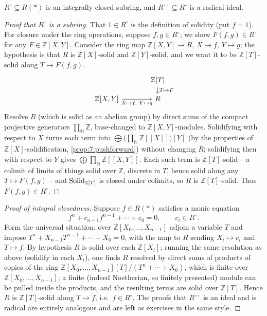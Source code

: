 \begin{lemma}
\label{lem:7:Rzero}
$R^{\circ}\subseteq R(\ast)$ is an integrally closed subring, and
$R^{\circ\circ}\subseteq R^{\circ}$ is a radical ideal.
\end{lemma}

\begin{proof}[Proof that $R^{\circ}$ is a subring]
That $1\in R^{\circ}$ is the definition of solidity (put $f=1$). For closure
under the ring operations, suppose $f,g\in R^{\circ}$; we show $F(f,g)\in
R^{\circ}$ for any $F\in\mathbb{Z}[X,Y]$. Consider the ring map
$\mathbb{Z}[X,Y]\to R$, $X\mapsto f$, $Y\mapsto g$; the hypothesis is that $R$
is $\mathbb{Z}[X]$-solid and $\mathbb{Z}[Y]$-solid, and we want it to be
$\mathbb{Z}[T]$-solid along $T\mapsto F(f,g)$.
\[
\begin{tikzcd}[row sep=small, column sep=large]
& \mathbb{Z}[T] \arrow[d, "T\mapsto F"] \\
\mathbb{Z}[X,Y] \arrow[r, "{X\mapsto f,\ Y\mapsto g}"'] & R
\end{tikzcd}
\]
Resolve $R$ (which is solid as an abelian group) by direct sums of the compact
projective generators $\prod_{\mathbb{N}}\mathbb{Z}$, base-changed to
$\mathbb{Z}[X,Y]$-modules. Solidifying with respect to $X$ turns each term into
$\bigoplus\bigl(\prod_{\mathbb{N}}\mathbb{Z}[\![X]\!]\bigr)[Y]$ (by the
properties of $\mathbb{Z}[X]$-solidification, \cref{prop:7:pushforward}) without
changing $R$; solidifying then with respect to $Y$ gives
$\bigoplus\prod_{\mathbb{N}}\mathbb{Z}[\![X,Y]\!]$. Each such term is
$\mathbb{Z}[T]$-solid -- a colimit of limits of things solid over $\mathbb{Z}$,
discrete in $T$, hence solid along any $T\mapsto F(f,g)$ -- and
$\mathrm{Solid}_{\mathbb{Z}[T]}$ is closed under colimits, so $R$ is
$\mathbb{Z}[T]$-solid. Thus $F(f,g)\in R^{\circ}$.
\end{proof}

\begin{proof}[Proof of integral closedness]
Suppose $f\in R(\ast)$ satisfies a monic equation
\begin{equation*}
f^{n}+c_{n-1}f^{n-1}+\cdots+c_{0}=0,\qquad c_i\in R^{\circ}.
\end{equation*}
Form the universal situation: over $\mathbb{Z}[X_0,\dots,X_{n-1}]$ adjoin a
variable $T$ and impose $T^{n}+X_{n-1}T^{n-1}+\cdots+X_0=0$, with the map to
$R$ sending $X_i\mapsto c_i$ and $T\mapsto f$. By hypothesis $R$ is solid over
each $\mathbb{Z}[X_i]$; running the same resolution as above (solidify in each
$X_i$), one finds $R$ resolved by direct sums of products of copies of the
ring $\mathbb{Z}[X_0,\dots,X_{n-1}][T]/(T^n+\cdots+X_0)$, which is finite over
$\mathbb{Z}[X_0,\dots,X_{n-1}]$; a finite (indeed Noetherian, so finitely
presented) module can be pulled inside the products, and the resulting terms are
solid over $\mathbb{Z}[T]$. Hence $R$ is $\mathbb{Z}[T]$-solid along
$T\mapsto f$, i.e.\ $f\in R^{\circ}$. The proofs that $R^{\circ\circ}$ is an
ideal and is radical are entirely analogous and are left as exercises in the
same style.
\end{proof}

